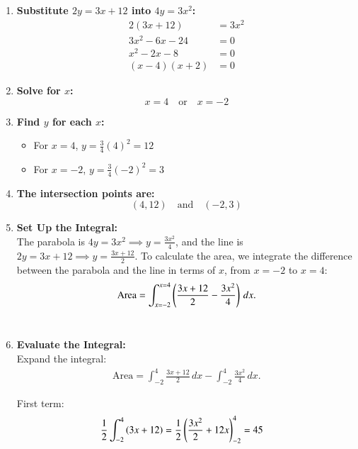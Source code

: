 \documentclass[journal]{IEEEtran}
\begin{document}
\begin{enumerate}
    \item \textbf{Substitute \( 2y = 3x + 12 \)  into $4y =3x^2$:}
    \begin{align}
    2(3x + 12) &= 3x^2  \\
    3x^2 - 6x -24 &= 0 \\
    x^2 -2x -8 &= 0 \\
    (x-4)(x +2) &= 0
    \end{align}

    \item \textbf{Solve for \( x \):}
    \[
    x = 4 \quad \text{or} \quad x = -2
    \]

    \item \textbf{Find \( y \) for each \( x \):}
    \begin{itemize}
        \item For \( x = 4 \), \( y = \frac{3}{4}(4)^2 = 12 \)
        \item For \( x = -2 \), \( y = \frac{3}{4}(-2)^2 = 3 \)
    \end{itemize}

    \item \textbf{The intersection points are:}
    \[
    (4, 12) \quad \text{and} \quad (-2, 3)
    \]


    \item \textbf{Set Up the Integral:}  \\
    The parabola is $4y = 3x^2 \implies y = \frac{3x^2}{4}$, and the line is $2y = 3x +12 \implies y=\frac{3x+12}{2}$.  
    To calculate the area, we integrate the difference between the parabola and the line in terms of $x$, from $x = -2$ to $x = 4$:
    \begin{align}
        \text{Area} = \int_{x=-2}^{x=4} \left( \frac{3x+12}{2} - \frac{3x^2}{4} \right) \, dx.
    \end{align} \\

    \item \textbf{Evaluate the Integral:}  \\
    Expand the integral:
    \begin{align}
        \text{Area} = \int_{-2}^{4}\frac{3x+12}{2}  \, dx - \int_{-2}^{4} \frac{3x^2}{4} \, dx.
    \end{align}

    First term:
    \begin{align}
        \frac{1}{2} \int_{-2}^{4}\left(3x+12\right)&= \frac{1}{2}\left(\frac{3x^2}{2}+12x\right)_{-2}^{4}= 45
        \end{align}


\end{enumerate}
\end{document}
